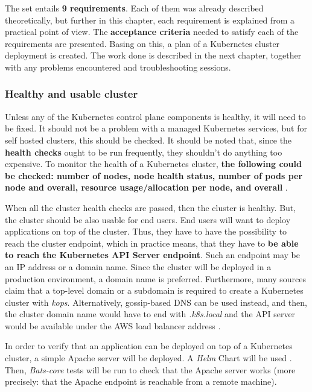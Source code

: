 The set entails \textbf{9 requirements}. Each of them was already described theoretically, but further in this chapter, each requirement is explained from a practical point of view. The \textbf{acceptance criteria} needed to satisfy each of the requirements are presented. Basing on this, a plan of a Kubernetes cluster deployment is created. The work done is described in the next chapter, together with any problems encountered and troubleshooting sessions.

\subsubsection{Healthy and usable cluster}
\label{A healthy cluster}

Unless any of the Kubernetes control plane components is healthy, it will need to be fixed. It should not be a problem with a managed Kubernetes services, but for self hosted clusters, this should be checked. It should be noted that, since the \textbf{health checks} ought to be run frequently, they shouldn't do anything too expensive. To monitor the health of a Kubernetes cluster, \textbf{the following could be checked: number of nodes, node health status, number of pods per node and overall, resource usage/allocation per node, and overall} \cite{book-cndwk}.

When all the cluster health checks are passed, then the cluster is healthy. But, the cluster should be also usable for end users. End users will want to deploy applications on top of the cluster. Thus, they have to have the possibility to reach the cluster endpoint, which in practice means, that they have to \textbf{be able to reach the Kubernetes API Server endpoint}. Such an endpoint may be an IP address or a domain name. Since the cluster will be deployed in a production environment, a domain name is preferred. Furthermore, many sources claim that a top-level domain or a subdomain is required to create a Kubernetes cluster with \textit{kops}. Alternatively, gossip-based DNS can be used instead, and then, the cluster domain name would have to end with \textit{.k8s.local} and the API server would be available under the AWS load balancer address \cite{online-kops-aws,kops-gossip,kops-howto-k8s,kops-howto-aws}.

In order to verify that an application can be deployed on top of a Kubernetes cluster, a simple Apache server will be deployed. A \textit{Helm} Chart will be used \cite{helm-apache}. Then, \textit{Bats-core} tests will be run to check that the Apache server works (more precisely: that the Apache endpoint is reachable from a remote machine).

